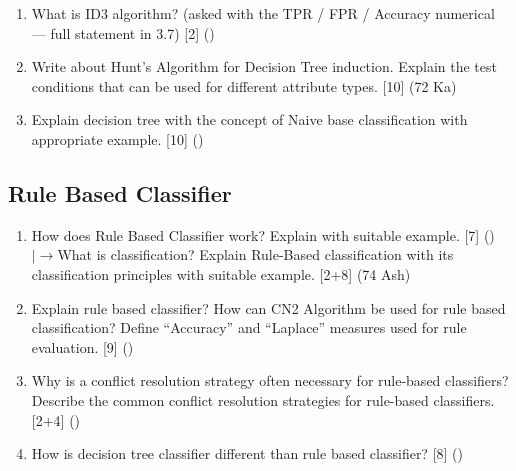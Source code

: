 \documentclass[12pt]{article}
\newcommand{\lb}{\\$\left|\rightarrow\right.$}
\begin{document}
\begin{enumerate}[topsep=0pt, noitemsep]
      \item What is ID3 algorithm? (asked with the TPR / FPR / Accuracy numerical --- full statement in 3.7) \hfill [2] ()

      \item Write about Hunt's Algorithm for Decision Tree induction. Explain the test conditions that can be used for different attribute types. \hfill [10] (72 Ka)

      \item Explain decision tree with the concept of Naive base classification with appropriate example. \hfill [10] ()
    \end{enumerate}

  \subsection{Rule Based Classifier}
    \begin{enumerate}[topsep=0pt, noitemsep]
      \item How does Rule Based Classifier work? Explain with suitable example. \hfill [7] ()
        \lb What is classification? Explain Rule-Based classification with its classification principles with suitable example. \hfill [2+8] (74 Ash)

      \item Explain rule based classifier? How can CN2 Algorithm be used for rule based classification? Define ``Accuracy'' and ``Laplace'' measures used for rule evaluation. \hfill [9] ()

      \item Why is a conflict resolution strategy often necessary for rule-based classifiers? Describe the common conflict resolution strategies for rule-based classifiers. \hfill [2+4] ()

      \item How is decision tree classifier different than rule based classifier? \hfill [8] ()
    \end{enumerate}
\end{document}
